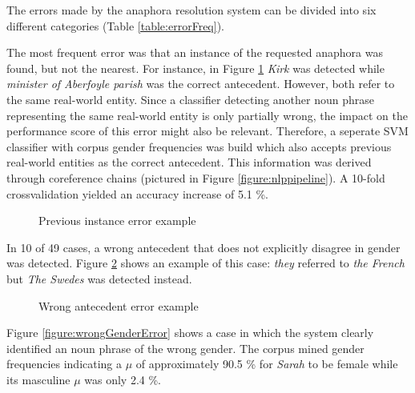 The errors made by the anaphora resolution system can be divided into six different categories (Table \ref{table:errorFreq}).

The most frequent error was that an instance of the requested anaphora was found, but not the nearest. For instance, in Figure \ref{figure:prevInstError} \textit{Kirk} was detected while \textit{minister of Aberfoyle parish} was the correct antecedent. However, both refer to the same real-world entity. Since a classifier detecting another noun phrase representing the same real-world entity is only partially wrong, the impact on the performance score of this error might also be relevant. Therefore, a seperate SVM classifier with corpus gender frequencies was build which also accepts previous real-world entities as the correct antecedent. This information was derived through coreference chains (pictured in Figure \ref{figure:nlppipeline}). A 10-fold crossvalidation yielded an accuracy increase of 5.1 \%.

\begin{figure}[h]
\centering
\caption{Previous instance error example}
	\label{figure:prevInstError}
\end{figure}

In 10 of 49 cases, a wrong antecedent that does not explicitly disagree in gender was detected. Figure \ref{figure:wrongAnteError} shows an example of this case: \textit{they} referred to \textit{the French} but \textit{The Swedes} was detected instead. 

\begin{figure}[h]
\centering
\caption{Wrong antecedent error example}
	\label{figure:wrongAnteError}
\end{figure}

Figure \ref{figure:wrongGenderError} shows a case in which the system clearly identified an noun phrase of the wrong gender. The corpus mined gender frequencies indicating a $\mu$ of approximately 90.5 \% for \textit{Sarah} to be female while its masculine $\mu$ was only 2.4 \%.

